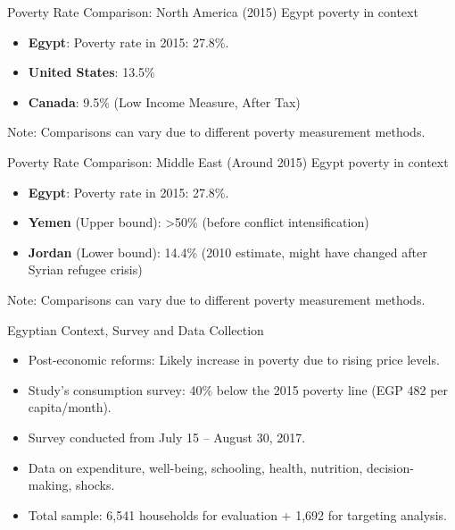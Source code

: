 \documentclass{beamer}
\begin{document}
\begin{frame}{Poverty Rate Comparison: North America (2015)}
Egypt poverty in context

\begin{itemize}
    \item \textbf{Egypt}: Poverty rate in 2015: 27.8\%.
    \item \textbf{United States}: 13.5\%
    \item \textbf{Canada}: 9.5\% (Low Income Measure, After Tax)
\end{itemize}
\small Note: Comparisons can vary due to different poverty measurement methods.
\end{frame}

\begin{frame}{Poverty Rate Comparison: Middle East (Around 2015)}
Egypt poverty in context

\begin{itemize}
    \item \textbf{Egypt}: Poverty rate in 2015: 27.8\%.
    \item \textbf{Yemen} (Upper bound): >50\% (before conflict intensification)
    \item \textbf{Jordan} (Lower bound): 14.4\% (2010 estimate, might have changed after Syrian refugee crisis)
\end{itemize}
\small Note: Comparisons can vary due to different poverty measurement methods.
\end{frame}





\begin{frame}{Egyptian Context, Survey and Data Collection}
\begin{itemize}
\item Post-economic reforms: Likely increase in poverty due to rising price levels.
\item Study's consumption survey: 40\% below the 2015 poverty line (EGP 482 per capita/month).
\item Survey conducted from July 15 – August 30, 2017.
\item Data on expenditure, well-being, schooling, health, nutrition, decision-making, shocks.
\item Total sample: 6,541 households for evaluation + 1,692 for targeting analysis.
\end{itemize}
\end{frame}
\end{document}
